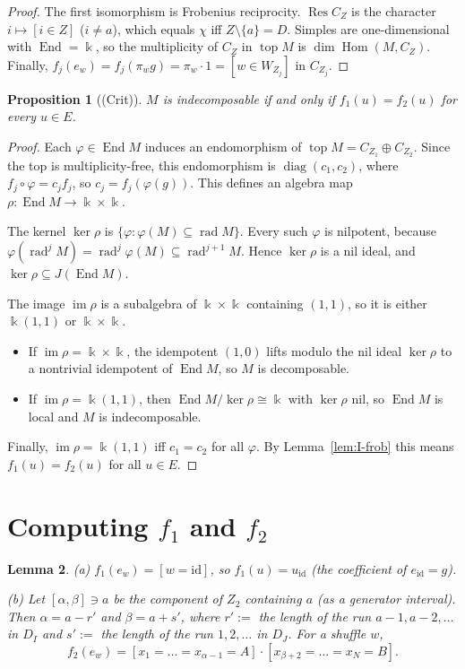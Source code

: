 \documentclass[11pt]{amsart}
\newcommand{\Hom}{\operatorname{Hom}}
\newcommand{\End}{\operatorname{End}}
\newcommand{\Res}{\operatorname{Res}}
\newcommand{\rad}{\operatorname{rad}}
\newcommand{\topp}{\operatorname{top}}
\newcommand{\kk}{\Bbbk}
\theoremstyle{plain}
\newtheorem{lemma}{Lemma}[section]
\newtheorem{proposition}[lemma]{Proposition}
\theoremstyle{definition}
\begin{document}
\begin{proof}
The first isomorphism is Frobenius reciprocity. $\Res C_Z$ is the character $i\mapsto[i\in Z]$ ($i\ne a$), which equals $\chi$ iff $Z\setminus\{a\}=D$. Simples are one-dimensional with $\End=\kk$, so the multiplicity of $C_Z$ in $\topp M$ is $\dim\Hom(M,C_Z)$. Finally, $f_j(e_w)=f_j(\pi_wg)=\pi_w\cdot1=[w\in W_{Z_j}]$ in $C_{Z_j}$.
\end{proof}

\begin{proposition}[(Crit)]\label{prop:crit}
$M$ is indecomposable if and only if $f_1(u)=f_2(u)$ for every $u\in E$.
\end{proposition}

\begin{proof}
Each $\varphi\in\End M$ induces an endomorphism of $\topp M=C_{Z_1}\oplus C_{Z_2}$. Since the top is multiplicity-free, this endomorphism is $\operatorname{diag}(c_1,c_2)$, where $f_j\circ\varphi=c_jf_j$, so $c_j=f_j(\varphi(g))$. This defines an algebra map $\rho:\End M\to\kk\times\kk$.

The kernel $\ker\rho$ is $\{\varphi:\varphi(M)\subseteq\rad M\}$. Every such $\varphi$ is nilpotent, because $\varphi(\rad^jM)=\rad^j\varphi(M)\subseteq\rad^{j+1}M$. Hence $\ker\rho$ is a nil ideal, and $\ker\rho\subseteq J(\End M)$.

The image $\operatorname{im}\rho$ is a subalgebra of $\kk\times\kk$ containing $(1,1)$, so it is either $\kk(1,1)$ or $\kk\times\kk$.
\begin{itemize}[itemsep=1pt]
\item If $\operatorname{im}\rho=\kk\times\kk$, the idempotent $(1,0)$ lifts modulo the nil ideal $\ker\rho$ to a nontrivial idempotent of $\End M$, so $M$ is decomposable.
\item If $\operatorname{im}\rho=\kk(1,1)$, then $\End M/\ker\rho\cong\kk$ with $\ker\rho$ nil, so $\End M$ is local and $M$ is indecomposable.
\end{itemize}
Finally, $\operatorname{im}\rho=\kk(1,1)$ iff $c_1=c_2$ for all $\varphi$. By Lemma~\ref{lem:I-frob} this means $f_1(u)=f_2(u)$ for all $u\in E$.
\end{proof}

\section{Computing \texorpdfstring{$f_1$ and $f_2$}{f1 and f2}}

\begin{lemma}\label{lem:f1f2}
\textup{(a)} $f_1(e_w)=[w=\mathrm{id}]$, so $f_1(u)=u_{\mathrm{id}}$ (the coefficient of $e_{\mathrm{id}}=g$).

\textup{(b)} Let $[\alpha,\beta]\ni a$ be the component of $Z_2$ containing $a$ (as a generator interval). Then $\alpha=a-r'$ and $\beta=a+s'$, where $r':=$ the length of the run $a-1,a-2,\dots$ in $D_I$ and $s':=$ the length of the run $1,2,\dots$ in $D_J$. For a shuffle $w$,
\begin{equation}\label{eq:f2}
f_2(e_w)=[x_1=\dots=x_{\alpha-1}=A]\cdot[x_{\beta+2}=\dots=x_N=B].
\end{equation}
\end{lemma}
\end{document}
